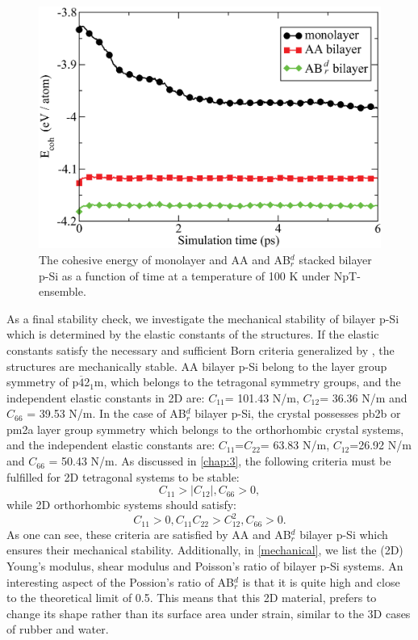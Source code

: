 \begin{figure}[htbp]
\centering
\includegraphics[width=0.7\linewidth]{ps_ab_initio_MD_100K.eps}%
\caption{The cohesive energy of monolayer and AA and AB$_r^d$ stacked bilayer p-Si as a function of time at a temperature of 100 K under NpT-ensemble. \label{fig:ps_MD}}
\end{figure}

As a final stability check, we investigate the mechanical stability of bilayer p-Si which is determined by the elastic constants of the structures. If the elastic constants satisfy the necessary and sufficient Born criteria generalized by \citet{Mouhat2014}, the structures are mechanically stable. AA bilayer p-Si belong to the layer group symmetry of p$\overline{4}$2$_1$m, which belongs to the tetragonal symmetry groups, and the independent elastic constants in 2D are: $C_{11}$= 101.43 N/m, $C_{12}$= 36.36 N/m and $C_{66}$ = 39.53  N/m. In the case of AB$_r^d$ bilayer p-Si, the crystal possesses pb2b or pm2a layer group symmetry which belongs to the orthorhombic crystal systems, and the independent elastic constants are: $C_{11}$=$C_{22}$= 63.83 N/m, $C_{12}$=26.92 N/m and $C_{66}$ = 50.43 N/m.  As discussed in \autoref{chap:3}, the following criteria must be fulfilled for 2D tetragonal systems to be stable:
\begin{equation}
C_{11}>|C_{12}|, C_{66}>0,
\end{equation}
while 2D orthorhombic systems should satisfy:
\begin{equation}
C_{11}>0,C_{11}C_{22}>C_{12}^2, C_{66}>0.
\end{equation}
As one can see, these criteria are satisfied by AA and AB$_r^d$ bilayer p-Si which ensures their mechanical stability. Additionally, in \autoref{mechanical}, we list the  (2D) Young's modulus, shear modulus and Poisson's ratio of bilayer p-Si systems. An interesting aspect of the Possion's ratio of AB$_r^d$ is that it is quite high and close to the theoretical limit of 0.5. This means that this 2D material, prefers to change its shape rather than its surface area under strain, similar to the 3D cases of rubber and water.

